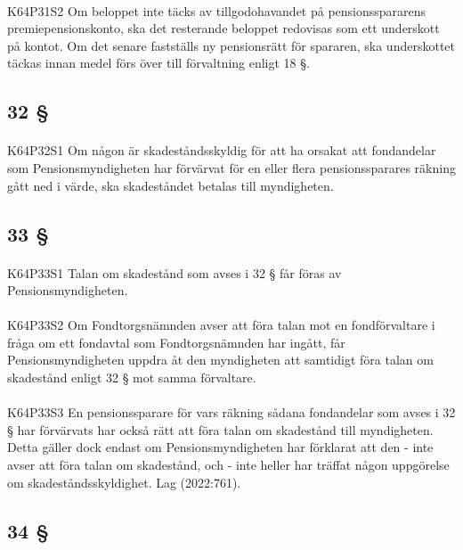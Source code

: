 \documentclass[a4paper,notitlepage,openany,10pt]{book}
\begin{document}
\paragraph*{}
{\tiny K64P31S2}
Om beloppet inte täcks av tillgodohavandet på pensionsspararens premiepensionskonto, ska det resterande beloppet redovisas som ett underskott på kontot. Om det senare fastställs ny pensionsrätt för spararen, ska underskottet täckas innan medel förs över till förvaltning enligt 18 §.
\subsection*{32 §}
\paragraph*{}
{\tiny K64P32S1}
Om någon är skadeståndsskyldig för att ha orsakat att fondandelar som Pensionsmyndigheten har förvärvat för en eller flera pensionssparares räkning gått ned i värde, ska skadeståndet betalas till myndigheten.
\subsection*{33 §}
\paragraph*{}
{\tiny K64P33S1}
Talan om skadestånd som avses i 32 § får föras av Pensionsmyndigheten.
\paragraph*{}
{\tiny K64P33S2}
Om Fondtorgsnämnden avser att föra talan mot en fondförvaltare i fråga om ett fondavtal som Fondtorgsnämnden har ingått, får Pensionsmyndigheten uppdra åt den myndigheten att samtidigt föra talan om skadestånd enligt 32 § mot samma förvaltare.
\paragraph*{}
{\tiny K64P33S3}
En pensionssparare för vars räkning sådana fondandelar som avses i 32 § har förvärvats har också rätt att föra talan om skadestånd till myndigheten. Detta gäller dock endast om Pensionsmyndigheten har förklarat att den
\newline - inte avser att föra talan om skadestånd, och
\newline - inte heller har träffat någon uppgörelse om skadeståndsskyldighet.
Lag (2022:761).
\subsection*{34 §}
\end{document}
